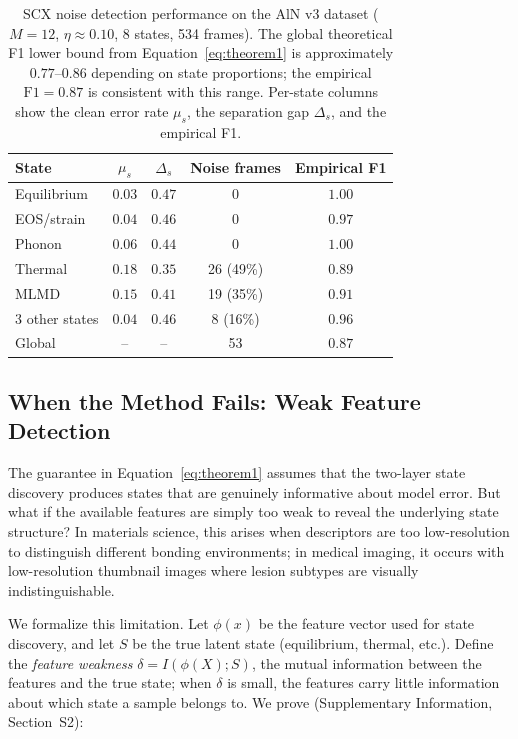 \begin{table}[t]
\caption{SCX noise detection performance on the AlN v3 dataset ($M = 12$, $\eta \approx 0.10$, 8 states, 534 frames). The global theoretical F1 lower bound from Equation~\eqref{eq:theorem1} is approximately $0.77$--$0.86$ depending on state proportions; the empirical $\mathrm{F1} = 0.87$ is consistent with this range. Per-state columns show the clean error rate $\mu_s$, the separation gap $\Delta_s$, and the empirical F1.}
\label{tab:aln_f1}
\begin{ruledtabular}
\begin{tabular}{lcccc}
\toprule
State & $\mu_s$ & $\Delta_s$ & Noise frames & Empirical F1 \\
\midrule
Equilibrium & $0.03$ & $0.47$ & 0 & $1.00$ \\
EOS/strain & $0.04$ & $0.46$ & 0 & $0.97$ \\
Phonon & $0.06$ & $0.44$ & 0 & $1.00$ \\
Thermal & $0.18$ & $0.35$ & 26 (49\%) & $0.89$ \\
MLMD & $0.15$ & $0.41$ & 19 (35\%) & $0.91$ \\
3 other states & $0.04$ & $0.46$ & 8 (16\%) & $0.96$ \\
\midrule
Global & -- & -- & 53 & $\mathbf{0.87}$ \\
\bottomrule
\end{tabular}
\end{ruledtabular}
\end{table}

\subsection{When the Method Fails: Weak Feature Detection}
\label{sec:weak_features}

The guarantee in Equation~\eqref{eq:theorem1} assumes that the two-layer state discovery produces states that are genuinely informative about model error. But what if the available features are simply too weak to reveal the underlying state structure? In materials science, this arises when descriptors are too low-resolution to distinguish different bonding environments; in medical imaging, it occurs with low-resolution thumbnail images where lesion subtypes are visually indistinguishable.

We formalize this limitation. Let $\phi(x)$ be the feature vector used for state discovery, and let $S$ be the true latent state (equilibrium, thermal, etc.). Define the \emph{feature weakness} $\delta = I(\phi(X); S)$, the mutual information between the features and the true state; when $\delta$ is small, the features carry little information about which state a sample belongs to. We prove (Supplementary Information, Section~S2):

